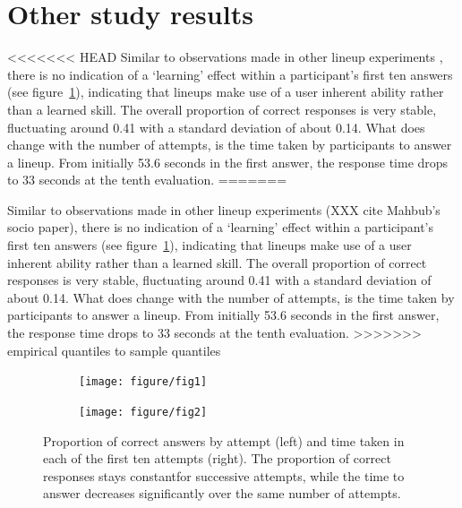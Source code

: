 \documentclass{article}\usepackage[]{graphicx}\usepackage[]{color}
\newenvironment{knitrout}{}{} %
\begin{document}
\section{Other study results}


<<<<<<< HEAD
 Similar to observations made in other lineup experiments \citep{Majumder:2014up}, there is no indication of a `learning' effect within a participant's first ten answers (see figure~\ref{fig:attempts}), indicating that lineups make use of a user inherent ability rather than a learned skill. The overall proportion of correct responses is very stable, fluctuating around 0.41 with a standard deviation of about 0.14.  What does change with the number of attempts, is the time taken by participants to answer a lineup. From initially 53.6 seconds in the first answer, the response time drops to 33 seconds at the tenth evaluation.
=======

 Similar to observations made in other lineup experiments (XXX cite Mahbub's socio paper), there is no indication of a `learning' effect within a participant's first ten answers (see figure~\ref{fig:attempts}), indicating that lineups make use of a user inherent ability rather than a learned skill. The overall proportion of correct responses is very stable, fluctuating around 0.41 with a standard deviation of about 0.14.  What does change with the number of attempts, is the time taken by participants to answer a lineup. From initially 53.6 seconds in the first answer, the response time drops to 33 seconds at the tenth evaluation.
>>>>>>> empirical quantiles to sample quantiles
\begin{figure}
\centering
\begin{subfigure}[b]{.3\textwidth}
\begin{knitrout}
\color{fgcolor}
\texttt{[image: figure/fig1]} 

\end{knitrout}

\end{subfigure}
\begin{subfigure}[b]{.3\textwidth}
\begin{knitrout}
\color{fgcolor}
\texttt{[image: figure/fig2]} 

\end{knitrout}

\end{subfigure}
\caption{\label{fig:attempts}Proportion of correct answers by attempt (left) and time taken in each of the first ten attempts (right). The proportion of correct responses stays constantfor successive attempts, while the time to answer decreases significantly over the same number of attempts.}
\end{figure}
\end{document}
